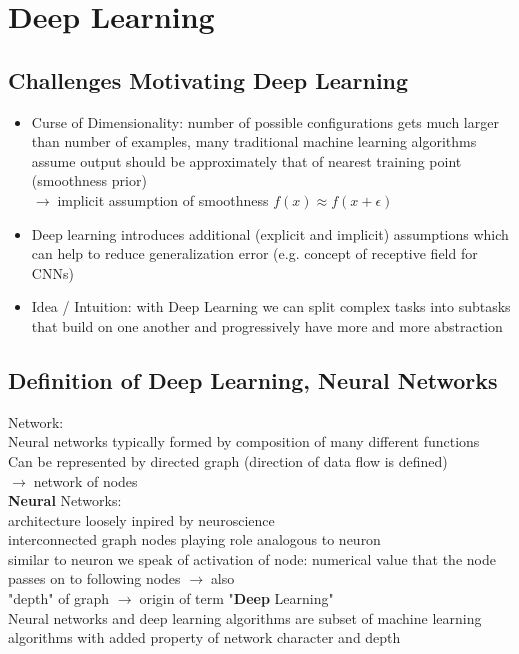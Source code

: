 \documentclass{article}
\newcommand{\arrow}{$\rightarrow\;$}
\begin{document}
\section{Deep Learning}

\subsection{Challenges Motivating Deep Learning}
\begin{itemize}
    \item Curse of Dimensionality: number of possible configurations gets much larger than number of examples, 
    many traditional machine learning algorithms assume output should be approximately that of nearest training point (smoothness prior)\\
    \arrow implicit assumption of smoothness $f(x) \approx f(x + \epsilon)$
    \item Deep learning introduces additional (explicit and implicit) assumptions which can help to reduce generalization error (e.g. concept of receptive field for CNNs)
    \item Idea / Intuition: with Deep Learning we can split complex tasks into subtasks that build on one another and progressively have more and more abstraction
\end{itemize}
    
\subsection{Definition of Deep Learning, Neural Networks}
Network:\\
Neural networks typically formed by composition of many different functions \\
Can be represented by directed graph (direction of data flow is defined) \\
\arrow network of nodes \\
\textbf{Neural} Networks: \\
architecture loosely inpired by neuroscience \\
interconnected graph nodes playing role analogous to neuron \\
similar to neuron we speak of activation of node: numerical value that the node passes on to following nodes \arrow also  \\
"depth" of graph \arrow origin of term "\textbf{Deep} Learning"  \\
Neural networks and deep learning algorithms are subset of machine learning algorithms with added property of network character and depth
\end{document}
